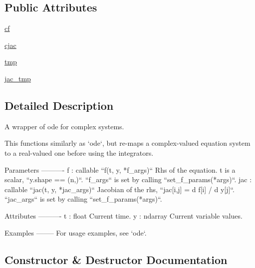\subsection*{Public Attributes}
\begin{DoxyCompactItemize}
\item 
\hyperlink{classscipy_1_1integrate_1_1__ode_1_1complex__ode_a3e5949a7d394007ba38855a8a5747919}{cf}
\item 
\hyperlink{classscipy_1_1integrate_1_1__ode_1_1complex__ode_a5afcac244dce0a8e521aef0ee869837a}{cjac}
\item 
\hyperlink{classscipy_1_1integrate_1_1__ode_1_1complex__ode_a50077638244fd7cc33ffadaf3c1f05f5}{tmp}
\item 
\hyperlink{classscipy_1_1integrate_1_1__ode_1_1complex__ode_a8b1c8eabea1303868f0869f532a9a8f7}{jac\+\_\+tmp}
\end{DoxyCompactItemize}


\subsection{Detailed Description}
\begin{DoxyVerb}A wrapper of ode for complex systems.

This functions similarly as `ode`, but re-maps a complex-valued
equation system to a real-valued one before using the integrators.

Parameters
----------
f : callable ``f(t, y, *f_args)``
    Rhs of the equation. t is a scalar, ``y.shape == (n,)``.
    ``f_args`` is set by calling ``set_f_params(*args)``.
jac : callable ``jac(t, y, *jac_args)``
    Jacobian of the rhs, ``jac[i,j] = d f[i] / d y[j]``.
    ``jac_args`` is set by calling ``set_f_params(*args)``.

Attributes
----------
t : float
    Current time.
y : ndarray
    Current variable values.

Examples
--------
For usage examples, see `ode`.\end{DoxyVerb}
 

\subsection{Constructor \& Destructor Documentation}
\hypertarget{classscipy_1_1integrate_1_1__ode_1_1complex__ode_a1814bd084fc5b7873cb78c4a05f0026a}{}
